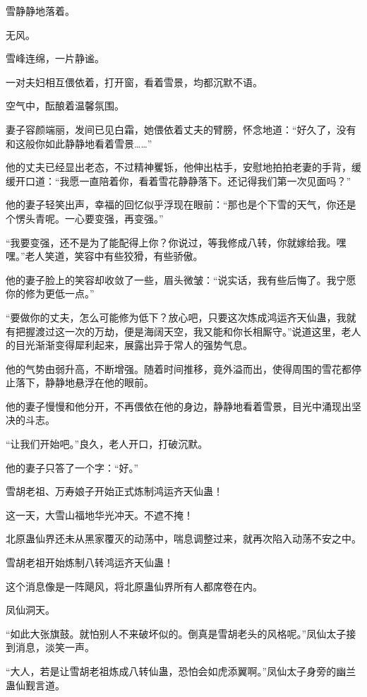 
\begin{this_body}

雪静静地落着。

无风。

雪峰连绵，一片静谧。

一对夫妇相互偎依着，打开窗，看着雪景，均都沉默不语。

空气中，酝酿着温馨氛围。

妻子容颜端丽，发间已见白霜，她偎依着丈夫的臂膀，怀念地道：“好久了，没有和这般你如此静静地看着雪景……”

他的丈夫已经显出老态，不过精神矍铄，他伸出枯手，安慰地拍拍老妻的手背，缓缓开口道：“我愿一直陪着你，看着雪花静静落下。还记得我们第一次见面吗？”

他的妻子轻笑出声，幸福的回忆似乎浮现在眼前：“那也是个下雪的天气，你还是个愣头青呢。一心要变强，再变强。”

“我要变强，还不是为了能配得上你？你说过，等我修成八转，你就嫁给我。嘿嘿。”老人笑道，笑容中有些狡猾，有些骄傲。

他的妻子脸上的笑容却收敛了一些，眉头微皱：“说实话，我有些后悔了。我宁愿你的修为更低一点。”

“要做你的丈夫，怎么可能修为低下？放心吧，只要这次炼成鸿运齐天仙蛊，我就有把握渡过这一次的万劫，便是海阔天空，我又能和你长相厮守。”说道这里，老人的目光渐渐变得犀利起来，展露出异于常人的强势气息。

他的气势由弱升高，不断增强。随着时间推移，竟外溢而出，使得周围的雪花都停止落下，静静地悬浮在他的眼前。

他的妻子慢慢和他分开，不再偎依在他的身边，静静地看着雪景，目光中涌现出坚决的斗志。

“让我们开始吧。”良久，老人开口，打破沉默。

他的妻子只答了一个字：“好。”

雪胡老祖、万寿娘子开始正式炼制鸿运齐天仙蛊！

这一天，大雪山福地华光冲天。不遮不掩！

北原蛊仙界还未从黑家覆灭的动荡中，喘息调整过来，就再次陷入动荡不安之中。

雪胡老祖开始炼制八转鸿运齐天仙蛊！

这个消息像是一阵飓风，将北原蛊仙界所有人都席卷在内。

凤仙洞天。

“如此大张旗鼓。就怕别人不来破坏似的。倒真是雪胡老头的风格呢。”凤仙太子接到消息，淡笑一声。

“大人，若是让雪胡老祖炼成八转仙蛊，恐怕会如虎添翼啊。”凤仙太子身旁的幽兰蛊仙觐言道。


\end{this_body}

